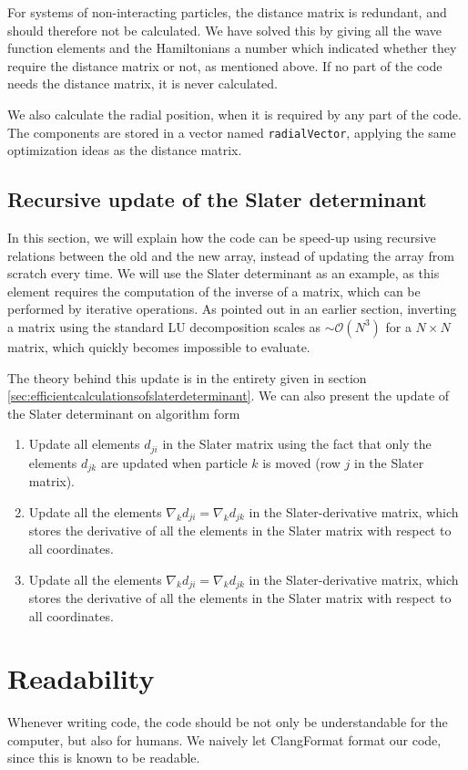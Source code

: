 For systems of non-interacting particles, the distance matrix is redundant, and should therefore not be calculated. We have solved this by giving all the wave function elements and the Hamiltonians a number which indicated whether they require the distance matrix or not, as mentioned above. If no part of the code needs the distance matrix, it is never calculated. 

We also calculate the radial position, when it is required by any part of the code. The components are stored in a vector named \lstinline{radialVector}, applying the same optimization ideas as the distance matrix. 

\subsection{Recursive update of the Slater determinant} \label{sec:updateslater}
In this section, we will explain how the code can be speed-up using recursive relations between the old and the new array, instead of updating the array from scratch every time. We will use the Slater determinant as an example, as this element requires the computation of the inverse of a matrix, which can be performed by iterative operations. As pointed out in an earlier section, inverting a matrix using the standard LU decomposition scales as $\sim\mathcal{O}(N^3)$ for a $N\times N$ matrix, which quickly becomes impossible to evaluate. 

The theory behind this update is in the entirety given in section \ref{sec:efficientcalculationsofslaterdeterminant}. We can also present the update of the Slater determinant on algorithm form
\begin{enumerate}
	\item Update all elements $d_{ji}$ in the Slater matrix using the fact that only the elements $d_{jk}$ are updated when particle $k$ is moved (row $j$ in the Slater matrix).
	\item Update all the elements $\nabla_kd_{ji}=\nabla_kd_{jk}$ in the Slater-derivative matrix, which stores the derivative of all the elements in the Slater matrix with respect to all coordinates.
	\item Update all the elements $\nabla_kd_{ji}=\nabla_kd_{jk}$ in the Slater-derivative matrix, which stores the derivative of all the elements in the Slater matrix with respect to all coordinates.
\end{enumerate}


\section{Readability}
Whenever writing code, the code should be not only be understandable for the computer, but also for humans. We naively let ClangFormat format our code, since this is known to be readable. 

